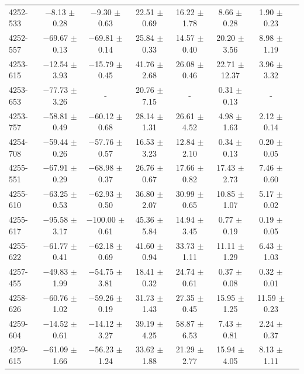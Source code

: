 \documentclass[a4paper,fleqn,usenatbib]{mnras}     %
\begin{document}
\begin{longtable}{l c c c c c c c }
4252-533   &    $-$8.13 $\pm$ 0.28   &    $-$9.30 $\pm$ 0.63   &    22.51 $\pm$ 0.69   &  16.22 $\pm$ 1.78   &   8.66 $\pm$ 0.28   &   1.90 $\pm$ 0.23  \\
4252-557   &   $-$69.67 $\pm$ 0.13   &   $-$69.81 $\pm$ 0.14   &    25.84 $\pm$ 0.33   &  14.57 $\pm$ 0.40   &  20.20 $\pm$ 3.56   &   8.98 $\pm$ 1.19  \\
4253-615   &   $-$12.54 $\pm$ 3.93   &   $-$15.79 $\pm$ 0.45   &    41.76 $\pm$ 2.68   &  26.08 $\pm$ 0.46   &  22.71 $\pm$12.37   &   3.96 $\pm$ 3.32  \\
4253-653   &   $-$77.73 $\pm$ 3.26   &     -   &    20.76 $\pm$ 7.15   &   -   &   0.31 $\pm$ 0.13   &   -  \\
4253-757   &   $-$58.81 $\pm$ 0.49   &   $-$60.12 $\pm$ 0.68   &    28.14 $\pm$ 1.31   &  26.61 $\pm$ 4.52   &   4.98 $\pm$ 1.63   &   2.12 $\pm$ 0.14  \\
4254-708   &   $-$59.44 $\pm$ 0.26   &   $-$57.76 $\pm$ 0.57   &    16.53 $\pm$ 3.23   &  12.84 $\pm$ 2.10   &   0.34 $\pm$ 0.13   &   0.20 $\pm$ 0.05  \\
4255-551   &   $-$67.91 $\pm$ 0.29   &   $-$68.98 $\pm$ 0.37   &    26.76 $\pm$ 0.67   &  17.66 $\pm$ 0.82   &  17.43 $\pm$ 2.73   &   7.46 $\pm$ 0.60  \\
4255-610   &   $-$63.25 $\pm$ 0.53   &   $-$62.93 $\pm$ 0.50   &    36.80 $\pm$ 2.07   &  30.99 $\pm$ 0.65   &  10.85 $\pm$ 1.07   &   5.17 $\pm$ 0.02  \\
4255-617   &   $-$95.58 $\pm$ 3.17   &  $-$100.00 $\pm$ 0.61   &    45.36 $\pm$ 5.84   &  14.94 $\pm$ 3.45   &   0.77 $\pm$ 0.19   &   0.19 $\pm$ 0.05  \\
4255-622   &   $-$61.77 $\pm$ 0.41   &   $-$62.18 $\pm$ 0.69   &    41.60 $\pm$ 0.94   &  33.73 $\pm$ 1.11   &  11.11 $\pm$ 1.29   &   6.43 $\pm$ 1.03  \\
4257-455   &   $-$49.83 $\pm$ 1.99   &   $-$54.75 $\pm$ 3.81   &    18.41 $\pm$ 0.32   &  24.74 $\pm$ 0.61   &   0.37 $\pm$ 0.08   &   0.32 $\pm$ 0.01  \\
4258-626   &   $-$60.76 $\pm$ 1.02   &   $-$59.26 $\pm$ 0.19   &    31.73 $\pm$ 1.43   &  27.35 $\pm$ 0.45   &  15.95 $\pm$ 1.25   &  11.59 $\pm$ 0.23  \\
4259-604   &   $-$14.52 $\pm$ 0.61   &   $-$14.12 $\pm$ 3.27   &    39.19 $\pm$ 4.25   &  58.87 $\pm$ 6.53   &   7.43 $\pm$ 0.81   &   2.24 $\pm$ 0.37  \\
4259-615   &   $-$61.09 $\pm$ 1.66   &   $-$56.23 $\pm$ 1.24   &    33.62 $\pm$ 1.88   &  21.29 $\pm$ 2.77   &  15.94 $\pm$ 4.05   &   8.13 $\pm$ 1.11  \\

\end{longtable}
\end{document}
